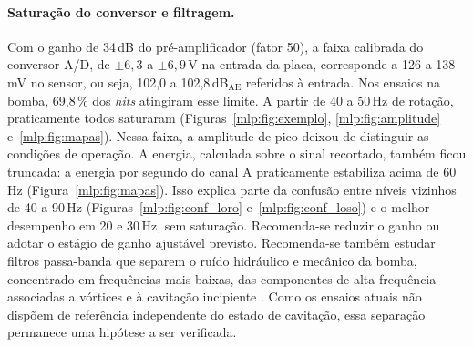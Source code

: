\paragraph{Saturação do conversor e filtragem.} Com o ganho de 34\,dB do pré-amplificador (fator 50), a faixa calibrada do conversor A/D, de \(\pm 6{,}3\) a \(\pm 6{,}9\)\,V na entrada da placa, corresponde a 126 a 138\,mV no sensor, ou seja, 102,0 a 102,8\,dB\(_{\mathrm{AE}}\) referidos à entrada. Nos ensaios na bomba, 69,8\,\% dos \textit{hits} atingiram esse limite. A partir de 40 a 50\,Hz de rotação, praticamente todos saturaram (Figuras~\ref{mlp:fig:exemplo}, \ref{mlp:fig:amplitude} e~\ref{mlp:fig:mapas}). Nessa faixa, a amplitude de pico deixou de distinguir as condições de operação. A energia, calculada sobre o sinal recortado, também ficou truncada: a energia por segundo do canal A praticamente estabiliza acima de 60\,Hz (Figura~\ref{mlp:fig:mapas}). Isso explica parte da confusão entre níveis vizinhos de 40 a 90\,Hz (Figuras~\ref{mlp:fig:conf_loro} e~\ref{mlp:fig:conf_loso}) e o melhor desempenho em 20 e 30\,Hz, sem saturação. Recomenda-se reduzir o ganho ou adotar o estágio de ganho ajustável previsto. Recomenda-se também estudar filtros passa-banda que separem o ruído hidráulico e mecânico da bomba, concentrado em frequências mais baixas, das componentes de alta frequência associadas a vórtices e à cavitação incipiente \cite{Neill1997Detection,Alfayez2005ndt}. Como os ensaios atuais não dispõem de referência independente do estado de cavitação, essa separação permanece uma hipótese a ser verificada.


